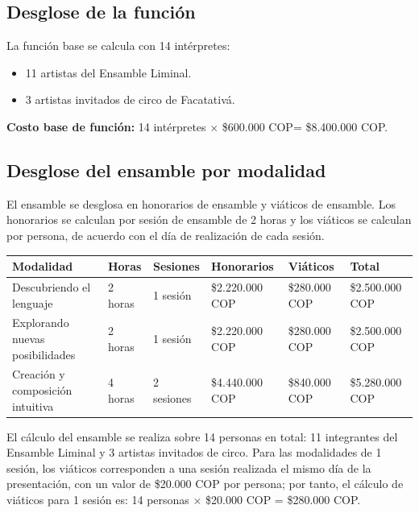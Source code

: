 \documentclass[11pt,a4paper]{article}
\newcommand{\SectionTone}{SectionBlue}
\newcommand{\tableheadcolor}{\rowcolor{\SectionTone!22}}
\newcommand{\cop}{COP}
\begin{document}
\subsection{Desglose de la función}

La función base se calcula con 14 intérpretes:

\begin{itemize}
  \item 11 artistas del Ensamble Liminal.
  \item 3 artistas invitados de circo de Facatativá.
\end{itemize}

\textbf{Costo base de función:} 14 intérpretes $\times$ \$600.000 \cop = \$8.400.000 \cop.

\subsection{Desglose del ensamble por modalidad}

El ensamble se desglosa en honorarios de ensamble y viáticos de ensamble. Los honorarios se calculan por sesión de ensamble de 2 horas y los viáticos se calculan por persona, de acuerdo con el día de realización de cada sesión.

{
\begin{tabularx}{\textwidth}{@{}L{0.23\textwidth}L{0.14\textwidth}L{0.14\textwidth}Y Y Y@{}}
\toprule
\tableheadcolor
\textbf{Modalidad} & \textbf{Horas} & \textbf{Sesiones} & \textbf{Honorarios} & \textbf{Viáticos} & \textbf{Total} \\
\midrule
Descubriendo el lenguaje & 2 horas & 1 sesión & \$2.220.000 \cop & \$280.000 \cop & \$2.500.000 \cop \\
Explorando nuevas posibilidades & 2 horas & 1 sesión & \$2.220.000 \cop & \$280.000 \cop & \$2.500.000 \cop \\
Creación y composición intuitiva & 4 horas & 2 sesiones & \$4.440.000 \cop & \$840.000 \cop & \$5.280.000 \cop \\
\bottomrule
\end{tabularx}
}

El cálculo del ensamble se realiza sobre 14 personas en total: 11 integrantes del Ensamble Liminal y 3 artistas invitados de circo. Para las modalidades de 1 sesión, los viáticos corresponden a una sesión realizada el mismo día de la presentación, con un valor de \$20.000 \cop{} por persona; por tanto, el cálculo de viáticos para 1 sesión es: 14 personas $\times$ \$20.000 \cop{} = \$280.000 \cop.
\end{document}
